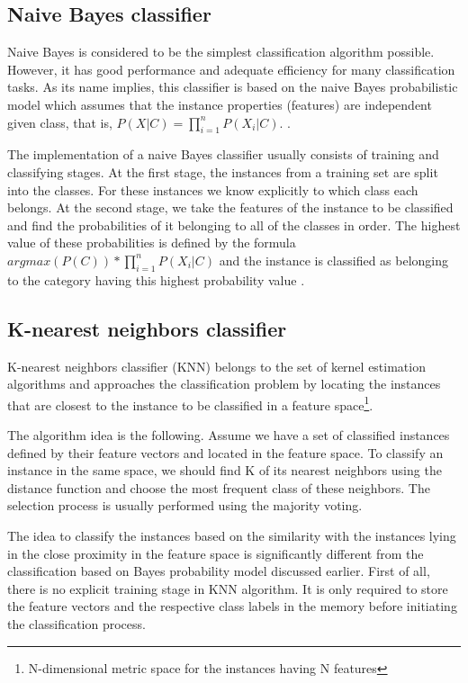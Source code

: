 \documentclass{llncs}
\begin{document}
\subsection{Naive Bayes classifier}

Naive Bayes is considered to be the simplest classification algorithm possible. However, it has good performance and adequate efficiency for many classification tasks. As its name implies, this classifier is based on the naive Bayes probabilistic model which assumes that the instance properties (features) are independent given class, that is, \(P(X|C) = \prod_{i=1}^nP(X_i|C)\). \cite{Rish}.

The implementation of a naive Bayes classifier usually consists of training and classifying stages. At the first stage, the instances from a training set are split into the classes. For these instances we know explicitly to which class each belongs. At the second stage, we take the features of the instance to be classified and find the probabilities of it belonging to all of the classes in order. The highest value of these probabilities is defined by the formula \(argmax(P(C)) * \prod_{i=1}^nP(X_i|C)\) and the instance is classified as belonging to the category having this highest probability value \cite{Manning}\cite{Rish}.

\subsection{K-nearest neighbors classifier}

K-nearest neighbors classifier (KNN) belongs to the set of kernel estimation algorithms and approaches the classification problem by locating the instances that are closest to the instance to be classified in a feature space\footnote{N-dimensional metric space for the instances having N features}.

The algorithm idea is the following. Assume we have a set of classified instances defined by their feature vectors and located in the feature space. To classify an instance in the same space, we should find K of its nearest neighbors using the distance function and choose the most frequent class of these neighbors. The selection process is usually performed using the majority voting.

The idea to classify the instances based on the similarity with the instances lying in the close proximity in the feature space is significantly different from the classification based on Bayes probability model discussed earlier. First of all, there is no explicit training stage in KNN algorithm. It is only required to store the feature vectors and the respective class labels in the memory before initiating the classification process.
\end{document}
